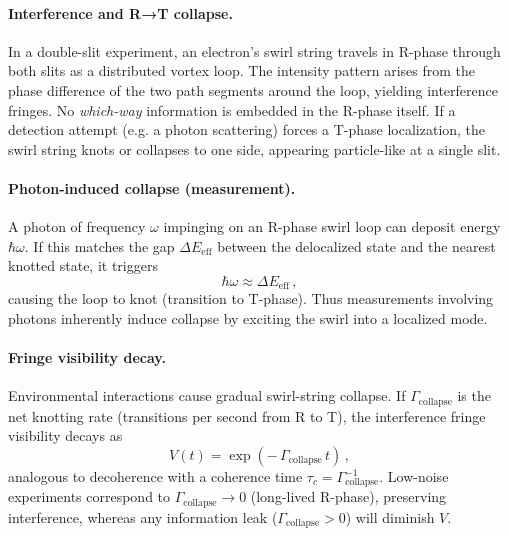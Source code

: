 \documentclass[11pt]{article}
\begin{document}
\paragraph{Interference and R→T collapse.}
    In a double-slit experiment, an electron's swirl string travels in R-phase through both slits as a distributed vortex loop. The intensity pattern arises from the phase difference of the two path segments around the loop, yielding interference fringes. No \emph{which-way} information is embedded in the R-phase itself. If a detection attempt (e.g. a photon scattering) forces a T-phase localization, the swirl string knots or collapses to one side, appearing particle-like at a single slit.

\paragraph{Photon-induced collapse (measurement).}
    A photon of frequency $\omega$ impinging on an R-phase swirl loop can deposit energy $\hbar\omega$. If this matches the gap $\Delta E_{\text{eff}}$ between the delocalized state and the nearest knotted state, it triggers
    \[
        \hbar\omega \approx \Delta E_{\text{eff}}\,,
    \]
    causing the loop to knot (transition to T-phase). Thus measurements involving photons inherently induce collapse by exciting the swirl into a localized mode.

\paragraph{Fringe visibility decay.}
    Environmental interactions cause gradual swirl-string collapse. If $\Gamma_{\text{collapse}}$ is the net knotting rate (transitions per second from R to T), the interference fringe visibility decays as
    \[
        V(t) = \exp(-\,\Gamma_{\text{collapse}}\,t)\,,
    \]
    analogous to decoherence with a coherence time $\tau_c = \Gamma_{\text{collapse}}^{-1}$. Low-noise experiments correspond to $\Gamma_{\text{collapse}}\to 0$ (long-lived R-phase), preserving interference, whereas any information leak ($\Gamma_{\text{collapse}}>0$) will diminish $V$.

\end{document}
